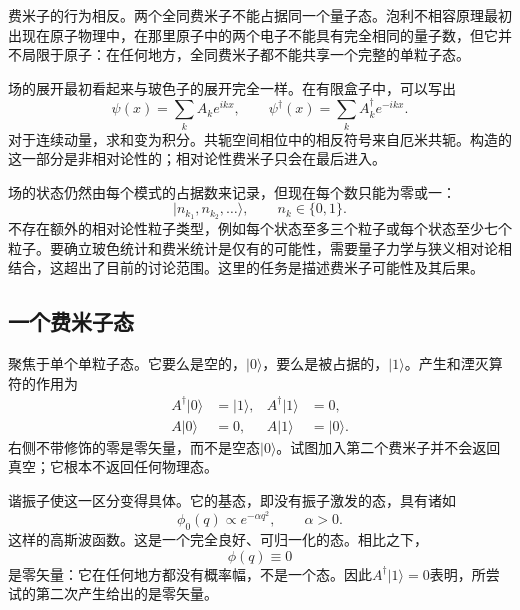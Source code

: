 费米子的行为相反。两个全同费米子不能占据同一个量子态。泡利不相容原理最初出现在原子物理中，在那里原子中的两个电子不能具有完全相同的量子数，但它并不局限于原子：在任何地方，全同费米子都不能共享一个完整的单粒子态。

场的展开最初看起来与玻色子的展开完全一样。在有限盒子中，可以写出
\begin{equation}
\psi(x)=\sum_k A_k e^{ikx},
\qquad
\psi^\dagger(x)=\sum_k A_k^\dagger e^{-ikx}.
\end{equation}
对于连续动量，求和变为积分。共轭空间相位中的相反符号来自厄米共轭。构造的这一部分是非相对论性的；相对论性费米子只会在最后进入。

场的状态仍然由每个模式的占据数来记录，但现在每个数只能为零或一：
\begin{equation}
|n_{k_1},n_{k_2},\ldots\rangle,
\qquad n_k\in\{0,1\}.
\end{equation}
不存在额外的相对论性粒子类型，例如每个状态至多三个粒子或每个状态至少七个粒子。要确立玻色统计和费米统计是仅有的可能性，需要量子力学与狭义相对论相结合，这超出了目前的讨论范围。这里的任务是描述费米子可能性及其后果。

\subsection{一个费米子态}

聚焦于单个单粒子态。它要么是空的，\(|0\rangle\)，要么是被占据的，\(|1\rangle\)。产生和湮灭算符的作用为
\begin{align}
A^\dagger|0\rangle&=|1\rangle,
&
A^\dagger|1\rangle&=0,
\\
A|0\rangle&=0,
&
A|1\rangle&=|0\rangle.
\end{align}
右侧不带修饰的零是零矢量，而不是空态\(|0\rangle\)。试图加入第二个费米子并不会返回真空；它根本不返回任何物理态。

\begin{classroomqa}
\end{classroomqa}

\begin{classroomqa}
\end{classroomqa}

谐振子使这一区分变得具体。它的基态，即没有振子激发的态，具有诸如
\begin{equation}
\phi_0(q)\propto e^{-\alpha q^2},
\qquad \alpha>0.
\end{equation}
这样的高斯波函数。这是一个完全良好、可归一化的态。相比之下，
\begin{equation}
\phi(q)\equiv0
\end{equation}
是零矢量：它在任何地方都没有概率幅，不是一个态。因此\(A^\dagger|1\rangle=0\)表明，所尝试的第二次产生给出的是零矢量。

